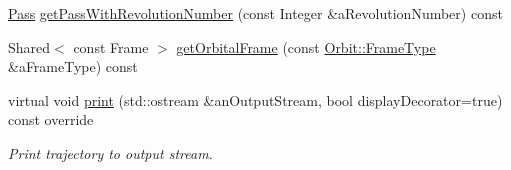 \begin{DoxyCompactItemize}
\item 
\hyperlink{classlibrary_1_1astro_1_1trajectory_1_1orbit_1_1_pass}{Pass} \hyperlink{classlibrary_1_1astro_1_1trajectory_1_1_orbit_a08833197c8d3774bf4436c1fb68c77ae}{get\+Pass\+With\+Revolution\+Number} (const Integer \&a\+Revolution\+Number) const
\item 
Shared$<$ const Frame $>$ \hyperlink{classlibrary_1_1astro_1_1trajectory_1_1_orbit_a0360f97e0b144d175477a4bd11db1beb}{get\+Orbital\+Frame} (const \hyperlink{classlibrary_1_1astro_1_1trajectory_1_1_orbit_a816e83a0c220d4242ce2bebd32191cd8}{Orbit\+::\+Frame\+Type} \&a\+Frame\+Type) const
\item 
virtual void \hyperlink{classlibrary_1_1astro_1_1trajectory_1_1_orbit_ac3b8c212e5b66822ab7eb09785a6c228}{print} (std\+::ostream \&an\+Output\+Stream, bool display\+Decorator=true) const override
\begin{DoxyCompactList}\small\item\em Print trajectory to output stream. \end{DoxyCompactList}\end{DoxyCompactItemize}
